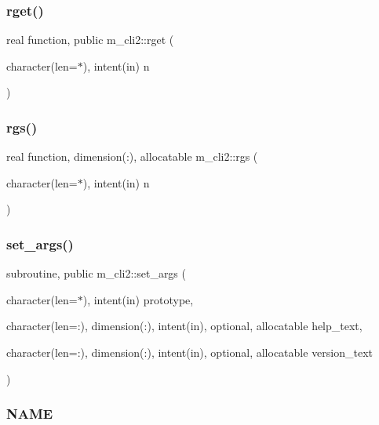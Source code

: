 \subsubsection{\texorpdfstring{rget()}{rget()}}
{\footnotesize\ttfamily real function, public m\+\_\+cli2\+::rget (\begin{DoxyParamCaption}\item[{character(len=$\ast$), intent(in)}]{n }\end{DoxyParamCaption})}

\mbox{\label{namespacem__cli2_ab526bbc0ccf60b19e298e49bf95e0595}} 
\subsubsection{\texorpdfstring{rgs()}{rgs()}}
{\footnotesize\ttfamily real function, dimension(\+:), allocatable m\+\_\+cli2\+::rgs (\begin{DoxyParamCaption}\item[{character(len=$\ast$), intent(in)}]{n }\end{DoxyParamCaption})\hspace{0.3cm}{\ttfamily [private]}}

\mbox{\label{namespacem__cli2_a6d20994aa80217dd3d0ffd1d5586f736}} 
\subsubsection{\texorpdfstring{set\+\_\+args()}{set\_args()}}
{\footnotesize\ttfamily subroutine, public m\+\_\+cli2\+::set\+\_\+args (\begin{DoxyParamCaption}\item[{character(len=$\ast$), intent(in)}]{prototype,  }\item[{character(len=\+:), dimension(\+:), intent(in), optional, allocatable}]{help\+\_\+text,  }\item[{character(len=\+:), dimension(\+:), intent(in), optional, allocatable}]{version\+\_\+text }\end{DoxyParamCaption})}



\subsubsection*{N\+A\+ME}

